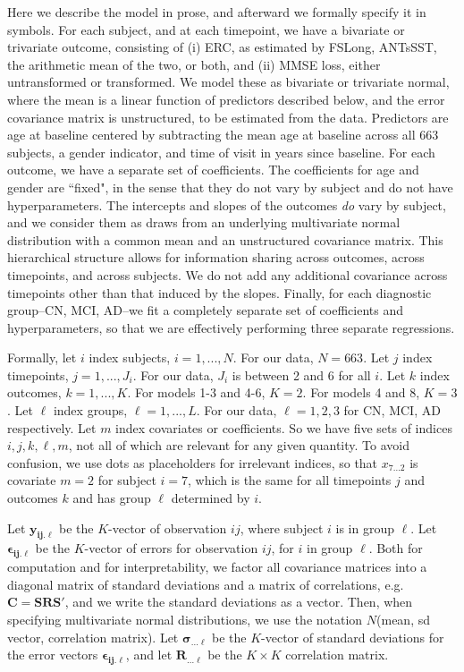\documentclass[12pt]{article}
\begin{document}
Here we describe the model in prose, and afterward we formally specify it in symbols. For each subject, and at each timepoint, we have a bivariate or trivariate outcome, consisting of (i) ERC, as estimated by FSLong, ANTsSST, the arithmetic mean of the two, or both, and (ii) MMSE loss, either untransformed or transformed. We model these as bivariate or trivariate normal, where the mean is a linear function of predictors described below, and the error covariance matrix is unstructured, to be estimated from the data. Predictors are age at baseline centered by subtracting the mean age at baseline across all 663 subjects, a gender indicator, and time of visit in years since baseline. For each outcome, we have a separate set of coefficients. The coefficients for age and gender are ``fixed", in the sense that they do not vary by subject and do not have hyperparameters. The intercepts and slopes of the outcomes \textit{do} vary by subject, and we consider them as draws from an underlying multivariate normal distribution with a common mean and an unstructured covariance matrix. This hierarchical structure allows for information sharing across outcomes, across timepoints, and across subjects. We do not add any additional covariance across timepoints other than that induced by the slopes. Finally, for each diagnostic group--CN, MCI, AD--we fit a completely separate set of coefficients and hyperparameters, so that we are effectively performing three separate regressions. 

Formally, let $i$ index subjects, $i=1,...,N$. For our data, $N = 663$. Let $j$ index timepoints, $j = 1, ..., J_i$. For our data, $J_i$ is between 2 and 6 for all $i$. Let $k$ index outcomes, $k=1,...,K$. For models 1-3 and 4-6, $K = 2.$ For models 4 and 8, $K = 3$. Let $\ell$ index groups, $\ell=1,...,L$. For our data, $\ell=1,2,3$ for CN, MCI, AD respectively. Let $m$ index covariates or coefficients. So we have five sets of indices $i,j,k,\ell,m$, not all of which are relevant for any given quantity. To avoid confusion, we use dots as placeholders for irrelevant indices, so that $x_{7...2}$ is covariate $m=2$ for subject $i=7$, which is the same for all timepoints $j$ and outcomes $k$ and has group $\ell$ determined by $i$. 

Let $\boldsymbol{y_{ij.\ell}}$ be the $K$-vector of observation $ij$, where subject $i$ is in group $\ell$. Let $\boldsymbol{\epsilon_{ij.\ell}}$ be the $K$-vector of errors for observation $ij$, for $i$ in group $\ell$. Both for computation and for interpretability, we factor all covariance matrices into a diagonal matrix of standard deviations and a matrix of correlations, e.g. $\boldsymbol{C=SRS'}$, and we write the standard deviations as a vector. Then, when specifying multivariate normal distributions, we use the notation $N$(mean, sd vector, correlation matrix). Let $\boldsymbol{\sigma_{...\ell}}$ be the $K$-vector of standard deviations for the error vectors $\boldsymbol{\epsilon_{ij.\ell}}$, and let $\boldsymbol{R_{...\ell}}$ be the $K \times K$ correlation matrix.
\end{document}
